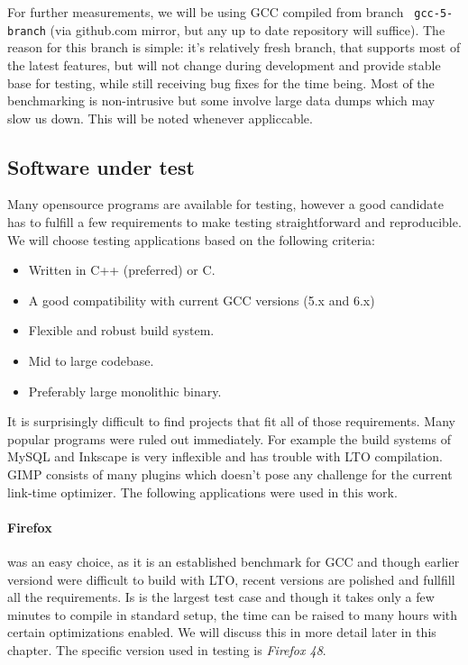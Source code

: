 For further measurements, we will be using GCC compiled from branch {\tt
gcc-5-branch} (via github.com mirror, but any up to date repository will
suffice). The reason for this branch is simple: it's relatively fresh branch,
that supports most of the latest features, but will not change during
development and provide stable base for testing, while still receiving bug fixes
for the time being. Most of the benchmarking is non-intrusive but some involve
large data dumps which may slow us down. This will be noted whenever appliccable.


\subsection{Software under test}

Many opensource programs are available for testing, however a good candidate has
to fulfill a few requirements to make testing straightforward and reproducible.
We will choose testing applications based on the following criteria:

\begin{itemize}
	\item Written in C++ (preferred) or C.
	\item A good compatibility with current GCC versions (5.x and 6.x)
	\item Flexible and robust build system.
	\item Mid to large codebase.
	\item Preferably large monolithic binary.
\end{itemize}

It is surprisingly difficult to find projects that fit all of those
requirements. Many popular programs were ruled out immediately. For example the
build systems of MySQL and Inkscape is very inflexible and has trouble with LTO
compilation. GIMP consists of many plugins which doesn't pose any challenge for
the current link-time optimizer. The following applications were used in this
work.

\paragraph{Firefox} was an easy choice, as it is an established benchmark for
GCC \cite{glek2010}
and though earlier versiond were difficult to build with LTO, recent versions
are polished and fullfill all the requirements. Is is the largest test case and
though it takes only a few minutes to compile in standard setup, the time can be
raised to many hours with certain optimizations enabled. We will discuss this in
more detail later in this chapter. The specific version used in
testing is {\it Firefox 48}.

